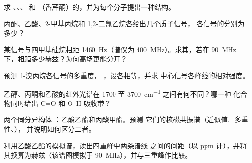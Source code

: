 \begin{exercise}[$\star$]\label{exo:b1:structure-spectroscopy:2}
求 、、、
 和 （香芹酮）的，并为每个分子提出一种结构。
\end{exercise}

\begin{exercise}[$\star$]\label{exo:b1:structure-spectroscopy:3}
丙酮、乙酸、2-甲基丙烷和 1,2-二氯乙烷各给出几个质子信号，
各信号的分别为多少？
\end{exercise}

\begin{exercise}[$\star$]\label{exo:b1:structure-spectroscopy:4}
某信号与四甲基硅烷相距 \qty{1460}{Hz}（谱仪为
\qty{400}{MHz}）。求其，若在 \qty{90}{MHz}
下，相距多少赫兹？为何高场更能分开？
\end{exercise}

\begin{exercise}[$\star\star$]\label{exo:b1:structure-spectroscopy:5}
预测 1-溴丙烷各信号的多重度，
，设各相等，并求
中心信号各峰线的相对强度。
\end{exercise}

\begin{exercise}[$\star\star$]\label{exo:b1:structure-spectroscopy:6}
乙醇、丙酮和乙酸的红外光谱在
1700 至 \qty{3700}{cm^{-1}} 之间有何不同？哪一种
化合物同时给出 C=O 和 O--H 吸收带？
\end{exercise}

\begin{exercise}[$\star\star$]\label{exo:b1:structure-spectroscopy:7}
两个同分异构体 ：乙酸乙酯和丙酸甲酯。预测
它们的核磁共振谱（近似值、多重性、），
并说明如何区分二者。
\end{exercise}

\begin{exercise}[$\star\star$]\label{exo:b1:structure-spectroscopy:8}
利用乙酸乙酯的模拟谱，读出四重峰中两条谱线
之间的间距（以 ppm 计），并将其换算为赫兹（该谱图模拟于
\qty{90}{MHz}），并与三重峰作比较。
\end{exercise}

